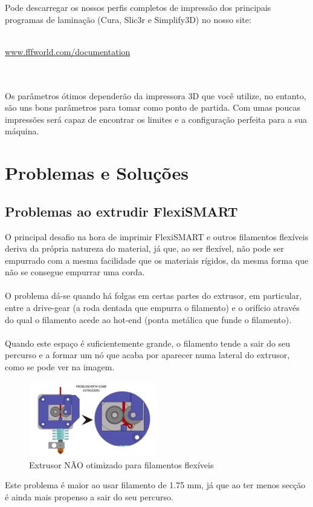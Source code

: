 \documentclass[11pt,a4paper]{article}
\begin{document}
Pode descarregar os nossos perfis completos de impressão dos principais programas de laminação (Cura, Slic3r e Simplify3D) no nosso site:
\\\\
\centerline{ {\huge \url{www.fffworld.com/documentation} } }
\\\\
Os parâmetros ótimos dependerão da impressora 3D que você utilize, no entanto, são uns bons parâmetros para tomar como ponto de partida. Com umas poucas impressões será capaz de encontrar os limites e a configuração perfeita para a sua máquina.
\section{Problemas e Soluções}
	\subsection{Problemas ao extrudir FlexiSMART}
O principal desafio na hora de imprimir FlexiSMART e outros filamentos flexíveis deriva da própria natureza do material, já que, ao ser flexível, não pode ser empurrado com a mesma facilidade que os materiais rígidos, da mesma forma que não se consegue empurrar uma corda.
\\\\
O problema dá-se quando há folgas em certas partes do extrusor, em particular, entre a drive-gear (a roda dentada que empurra o filamento) e o orifício através do qual o filamento acede ao hot-end (ponta metálica que funde o filamento).
\\\\
Quando este espaço é suficientemente grande, o filamento tende a sair do seu percurso e a formar um nó que acaba por aparecer numa lateral do extrusor, como se pode ver na imagem.
\begin{figure}[H]
\centering
\includegraphics[width=0.5\textwidth,cfbox=azul_marcos 4pt 0pt]{FOTOS/NUDOS1}
\caption*{Extrusor NÃO otimizado para filamentos flexíveis}
\end{figure}
Este problema é maior ao usar filamento de 1.75 mm, já que ao ter menos secção é ainda mais propenso a sair do seu percurso.
\end{document}
